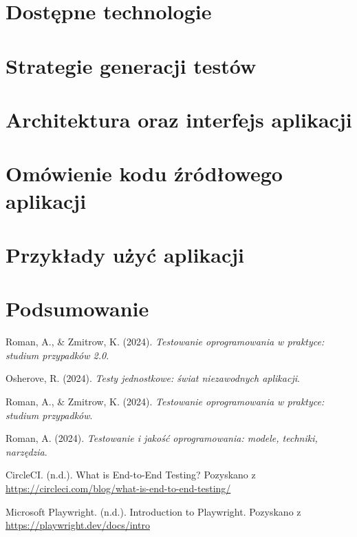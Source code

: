 \documentclass[12pt]{report}
\begin{document}
\chapter{Dostępne technologie}

\chapter{Strategie generacji testów}

\chapter{Architektura oraz interfejs aplikacji}

\chapter{Omówienie kodu źródłowego aplikacji}

\chapter{Przykłady użyć aplikacji}

\chapter{Podsumowanie}

\begin{thebibliography}{9}
     Roman, A., \& Zmitrow, K. (2024). \textit{Testowanie oprogramowania w praktyce: studium przypadków 2.0}.

     Osherove, R. (2024). \textit{Testy jednostkowe: świat niezawodnych aplikacji}.

     Roman, A., \& Zmitrow, K. (2024). \textit{Testowanie oprogramowania w praktyce: studium przypadków}.

     Roman, A. (2024). \textit{Testowanie i jakość oprogramowania: modele, techniki, narzędzia}.

     CircleCI. (n.d.). What is End-to-End Testing? Pozyskano z \url{https://circleci.com/blog/what-is-end-to-end-testing/}

     Microsoft Playwright. (n.d.). Introduction to Playwright. Pozyskano z \url{https://playwright.dev/docs/intro}
\end{thebibliography}
\end{document}
